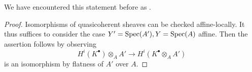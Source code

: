 We have encountered this statement before as .
\begin{proof}
    Isomorphisms of quasicoherent sheaves can be checked affine-locally. It thus suffices to consider the case $Y'=\operatorname{Spec}(A'),Y=\operatorname{Spec}(A)$ affine. Then the assertion follows by observing 
    $$H^{i}(K^{\bullet})\otimes_{A}A'\longrightarrow H^{i}(K^{\bullet}\otimes_{A}A')$$
    is an isomorphism by flatness of $A'$ over $A$. 
\end{proof}